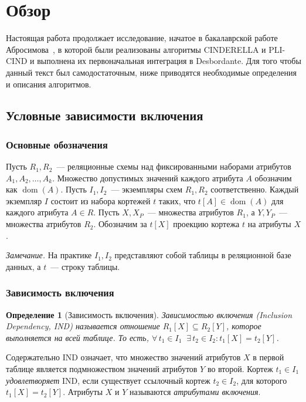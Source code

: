 
\section{Обзор}
\label{sec:relatedworks}

Настоящая работа продолжает исследование, начатое в бакалаврской работе Абросимова~\cite{abrosimov2025cinderella}, в которой были реализованы алгоритмы CINDERELLA и PLI-CIND и выполнена их первоначальная интеграция в Desbordante. Для того чтобы данный текст был самодостаточным, ниже приводятся необходимые определения и описания алгоритмов.

\subsection{Условные зависимости включения}

\subsubsection{Основные обозначения}

Пусть $R_1, R_2$~--- реляционные схемы над фиксированными наборами атрибутов $A_1, A_2, \ldots, A_k$. Множество допустимых значений каждого атрибута $A$ обозначим как $\operatorname{dom}(A)$. Пусть $I_1, I_2$~--- экземпляры схем $R_1, R_2$ соответственно. Каждый экземпляр $I$ состоит из набора кортежей $t$ таких, что $t[A] \in \operatorname{dom}(A)$ для каждого атрибута $A \in R$. Пусть $X, X_P$~--- множества атрибутов $R_1$, а $Y, Y_P$~--- множества атрибутов $R_2$. Обозначим за $t[X]$ проекцию кортежа $t$ на атрибуты $X$.

\emph{Замечание.} На практике $I_1, I_2$ представляют собой таблицы в реляционной базе данных, а $t$~--- строку таблицы.

\subsubsection{Зависимость включения}

\textbf{Определение 1} (Зависимость включения). \emph{Зависимостью включения (Inclusion Dependency, IND) называется отношение $R_1[X] \subseteq R_2[Y]$, которое выполняется на всей таблице. То есть, $\forall\, t_1 \in I_1 \;\; \exists\, t_2 \in I_2 : t_1[X] = t_2[Y]$.}

Содержательно IND означает, что множество значений атрибутов $X$ в первой таблице является подмножеством значений атрибутов $Y$ во второй. Кортеж $t_1 \in I_1$ \emph{удовлетворяет} IND, если существует ссылочный кортеж $t_2 \in I_2$, для которого $t_1[X] = t_2[Y]$. Атрибуты $X$ и $Y$ называются \emph{атрибутами включения}.

